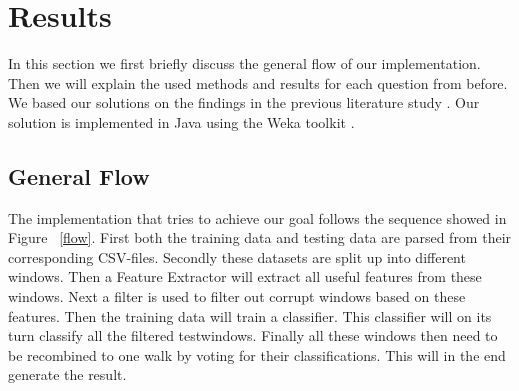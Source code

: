 \section{Results}
In this section we first briefly discuss the general flow of our implementation. Then we will explain the used methods and results for each question from before. We based our solutions on the findings in the previous literature study \cite{literatuurstudie}. Our solution is implemented in Java using the Weka toolkit \cite{Weka}.

\subsection{General Flow}
The implementation that tries to achieve our goal follows the sequence showed in Figure ~\ref{flow}.
First both the training data and testing data are parsed from their corresponding CSV-files.
Secondly these datasets are split up into different windows. Then a Feature Extractor will extract all useful features from these windows. Next a filter is used to filter out corrupt windows based on these features. Then the training data will train a classifier. This classifier will on its turn classify all the filtered testwindows.
Finally all these windows then need to be recombined to one walk by voting for their classifications. This will in the end generate the result.

